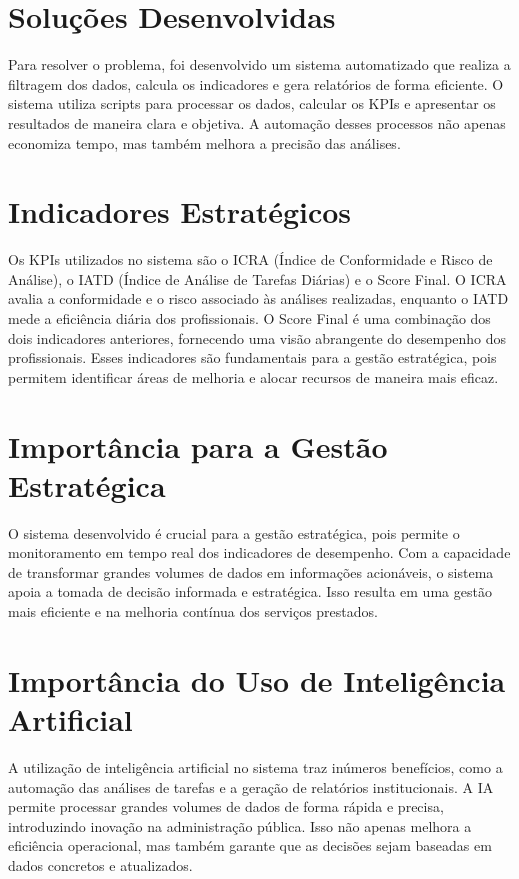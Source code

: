 \documentclass[11pt]{article}
\begin{document}
\section{Soluções Desenvolvidas}
\label{sec:orgb9f4a68}

Para resolver o problema, foi desenvolvido um sistema automatizado que realiza a filtragem dos dados, calcula os indicadores e gera relatórios de forma eficiente. O sistema utiliza scripts para processar os dados, calcular os KPIs e apresentar os resultados de maneira clara e objetiva. A automação desses processos não apenas economiza tempo, mas também melhora a precisão das análises.

\section{Indicadores Estratégicos}
\label{sec:org41e8762}

Os KPIs utilizados no sistema são o ICRA (Índice de Conformidade e Risco de Análise), o IATD (Índice de Análise de Tarefas Diárias) e o Score Final. O ICRA avalia a conformidade e o risco associado às análises realizadas, enquanto o IATD mede a eficiência diária dos profissionais. O Score Final é uma combinação dos dois indicadores anteriores, fornecendo uma visão abrangente do desempenho dos profissionais. Esses indicadores são fundamentais para a gestão estratégica, pois permitem identificar áreas de melhoria e alocar recursos de maneira mais eficaz.

\section{Importância para a Gestão Estratégica}
\label{sec:org2ad1370}

O sistema desenvolvido é crucial para a gestão estratégica, pois permite o monitoramento em tempo real dos indicadores de desempenho. Com a capacidade de transformar grandes volumes de dados em informações acionáveis, o sistema apoia a tomada de decisão informada e estratégica. Isso resulta em uma gestão mais eficiente e na melhoria contínua dos serviços prestados.

\section{Importância do Uso de Inteligência Artificial}
\label{sec:org1a6ff0e}

A utilização de inteligência artificial no sistema traz inúmeros benefícios, como a automação das análises de tarefas e a geração de relatórios institucionais. A IA permite processar grandes volumes de dados de forma rápida e precisa, introduzindo inovação na administração pública. Isso não apenas melhora a eficiência operacional, mas também garante que as decisões sejam baseadas em dados concretos e atualizados.
\end{document}
